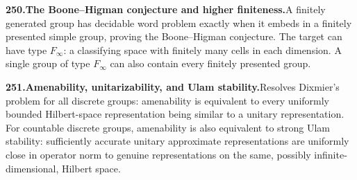 \documentclass[11pt,a4paper]{article}
\begin{document}
  \par \begin{minipage}{\linewidth}
  \fontsize{10.5}{12.6}\selectfont\RaggedRight
  \hypertarget{result 250}{}
  {\bfseries\textcolor{muted}{250.}\enspace The Boone--Higman conjecture and higher finiteness.}\enspace A finitely generated group has decidable word problem exactly when it embeds in a finitely presented simple group, proving the Boone--Higman conjecture. The target can have type $F_\infty$: a classifying space with finitely many cells in each dimension. A single group of type $F_\infty$ can also contain every finitely presented group.\par
  \end{minipage}\par\vspace{5pt}



  \par \begin{minipage}{\linewidth}
  \fontsize{10.5}{12.6}\selectfont\RaggedRight
  \hypertarget{result 251}{}
  {\bfseries\textcolor{muted}{251.}\enspace Amenability, unitarizability, and Ulam stability.}\enspace Resolves Dixmier's problem for all discrete groups: amenability is equivalent to every uniformly bounded Hilbert-space representation being similar to a unitary representation. For countable discrete groups, amenability is also equivalent to strong Ulam stability: sufficiently accurate unitary approximate representations are uniformly close in operator norm to genuine representations on the same, possibly infinite-dimensional, Hilbert space.\par
  \end{minipage}\par\vspace{5pt}
\end{document}
